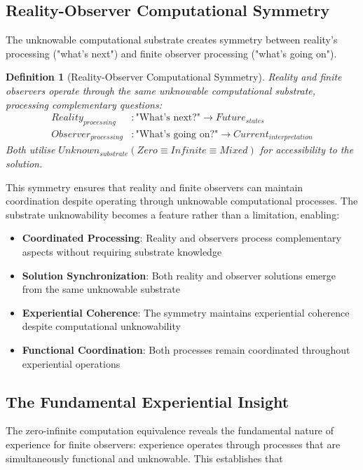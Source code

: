 \documentclass{article}
\newtheorem{definition}[theorem]{Definition}
\begin{document}
\subsection{Reality-Observer Computational Symmetry}

The unknowable computational substrate creates symmetry between reality's processing ("what's next") and finite observer processing ("what's going on").

\begin{definition}[Reality-Observer Computational Symmetry]
Reality and finite observers operate through the same unknowable computational substrate, processing complementary questions:
\begin{align}
Reality_{processing} &: \text{"What's next?"} \rightarrow Future_{states} \\
Observer_{processing} &: \text{"What's going on?"} \rightarrow Current_{interpretation}
\end{align}
Both utilise $Unknown_{substrate}(Zero \equiv Infinite \equiv Mixed)$ for accessibility to the solution.
\end{definition}

This symmetry ensures that reality and finite observers can maintain coordination despite operating through unknowable computational processes. The substrate unknowability becomes a feature rather than a limitation, enabling:

\begin{itemize}
\item \textbf{Coordinated Processing}: Reality and observers process complementary aspects without requiring substrate knowledge
\item \textbf{Solution Synchronization}: Both reality and observer solutions emerge from the same unknowable substrate
\item \textbf{Experiential Coherence}: The symmetry maintains experiential coherence despite computational unknowability
\item \textbf{Functional Coordination}: Both processes remain coordinated throughout experiential operations
\end{itemize}

\subsection{The Fundamental Experiential Insight}

The zero-infinite computation equivalence reveals the fundamental nature of experience for finite observers: experience operates through processes that are simultaneously functional and unknowable. This establishes that
\end{document}
